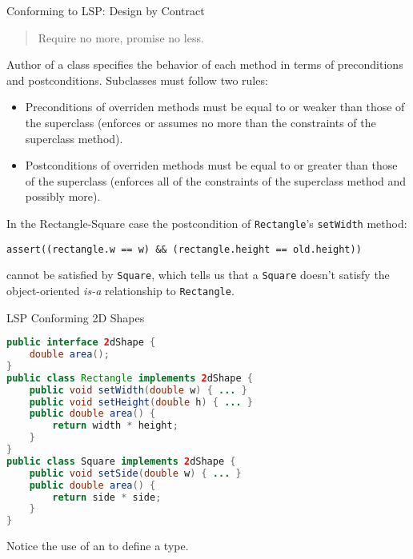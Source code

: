 \documentclass{beamer}
\begin{document}
\begin{frame}[fragile]{Conforming to LSP: Design by Contract}


\begin{quote}
Require no more, promise no less.
\end{quote}

Author of a class specifies the behavior of each method in terms of preconditions and postconditions.  Subclasses must follow two rules:
\begin{itemize}
\item Preconditions of overriden methods must be equal to or weaker than those of the superclass (enforces or assumes no more than the constraints of the superclass method).
\item Postconditions of overriden methods must be equal to or greater than those of the superclass (enforces all of the constraints of the superclass method and possibly more).
\end{itemize}

In the Rectangle-Square case the postcondition of {\tt Rectangle}'s {\tt setWidth} method:
\begin{lstlisting}
assert((rectangle.w == w) && (rectangle.height == old.height))
\end{lstlisting}
cannot be satisfied by {\tt Square}, which tells us that a {\tt Square} doesn't satisfy the object-oriented {\it is-a} relationship to {\tt Rectangle}.

\end{frame}

\begin{frame}[fragile]{LSP Conforming 2D Shapes}

\begin{lstlisting}[language=Java]
public interface 2dShape {
    double area();
}
public class Rectangle implements 2dShape {
    public void setWidth(double w) { ... }
    public void setHeight(double h) { ... }
    public double area() {
        return width * height;
    }
}
public class Square implements 2dShape {
    public void setSide(double w) { ... }
    public double area() {
        return side * side;
    }
}
\end{lstlisting}

Notice the use of an  to define a type.  

\end{frame}










\end{document}
